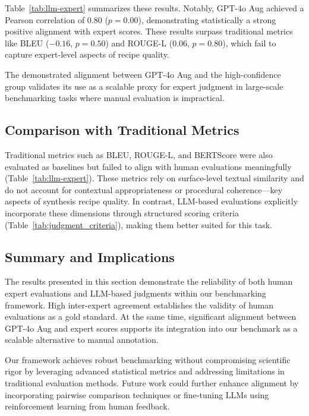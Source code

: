 Table~\ref{tab:llm-expert} summarizes these results. Notably, GPT-4o Aug achieved a Pearson correlation of 0.80 (\(p=0.00\)), demonstrating statistically a strong positive alignment with expert scores. These results surpass traditional metrics like BLEU (\(-0.16\), \(p=0.50\)) and ROUGE-L (0.06, \(p=0.80\)), which fail to capture expert-level aspects of recipe quality.

The demonstrated alignment between GPT-4o Aug and the high-confidence group validates its use as a scalable proxy for expert judgment in large-scale benchmarking tasks where manual evaluation is impractical.

\subsection{Comparison with Traditional Metrics}
\label{subsec:traditional_metrics}

Traditional metrics such as BLEU, ROUGE-L, and BERTScore were also evaluated as baselines but failed to align with human evaluations meaningfully (Table~\ref{tab:llm-expert}). These metrics rely on surface-level textual similarity and do not account for contextual appropriateness or procedural coherence—key aspects of synthesis recipe quality. In contrast, LLM-based evaluations explicitly incorporate these dimensions through structured scoring criteria (Table~\ref{tab:judgment_criteria}), making them better suited for this task.

\subsection{Summary and Implications}
\label{subsec:summary_implications}

The results presented in this section demonstrate the reliability of both human expert evaluations and LLM-based judgments within our benchmarking framework. High inter-expert agreement establishes the validity of human evaluations as a gold standard. At the same time, significant alignment between GPT-4o Aug and expert scores supports its integration into our benchmark as a scalable alternative to manual annotation.

Our framework achieves robust benchmarking without compromising scientific rigor by leveraging advanced statistical metrics and addressing limitations in traditional evaluation methods. Future work could further enhance alignment by incorporating pairwise comparison techniques or fine-tuning LLMs using reinforcement learning from human feedback.

